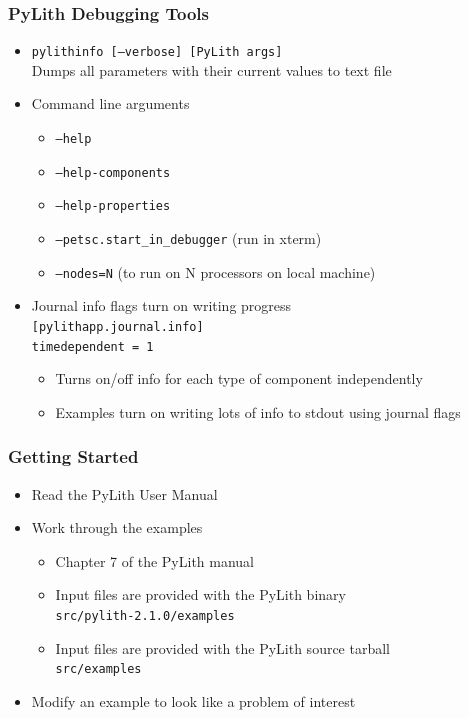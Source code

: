 \documentclass{beamer}
\newcommand{\important}[1]{{\color{red}#1}}
\begin{document}
\begin{frame}
  \frametitle{PyLith Debugging Tools}
  \summary{}

  \begin{itemize}
  \item {\tt pylithinfo [--verbose] [PyLith args]}\\
    Dumps all parameters with their current values to text file
  \item Command line arguments
    \begin{itemize}
    \item {\tt --help}
    \item {\tt --help-components}
    \item {\tt --help-properties}
    \item {\tt --petsc.start\_in\_debugger} (run in xterm)
    \item {\tt --nodes=N} (to run on N processors on local machine)
    \end{itemize}
  \item Journal info flags turn on writing progress\\
    {\tt [pylithapp.journal.info]}\\
    {\tt timedependent = 1} \\
    \begin{itemize}
    \item Turns on/off info for each type of component independently
    \item Examples turn on writing lots of info to stdout using journal flags
    \end{itemize}
  \end{itemize}

\end{frame}


\begin{frame}
  \frametitle{Getting Started}
  \summary{}

  \begin{itemize}
  \item Read the PyLith User Manual
  \item Work through the examples
    \begin{itemize}
    \item \important{Chapter 7} of the PyLith manual
    \item Input files are provided with the PyLith binary\\
      {\tt \important{src/pylith-2.1.0/examples}}
    \item Input files are provided with the PyLith source tarball\\
      {\tt \important{src/examples}}
    \end{itemize}
  \item Modify an example to look like a problem of interest
  \end{itemize}

\end{frame}


\end{document}
